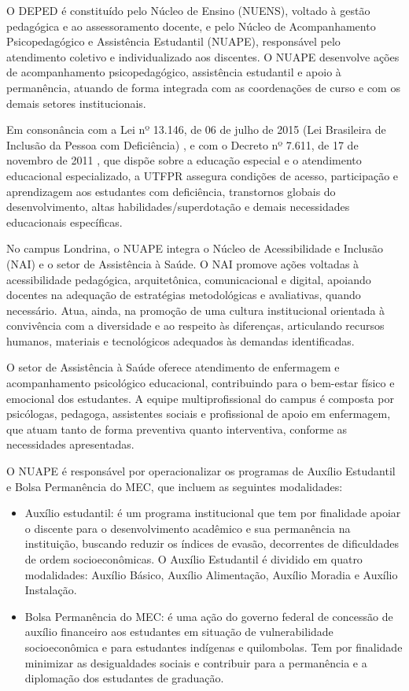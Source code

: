 O DEPED é constituído pelo Núcleo de Ensino (NUENS), voltado à gestão pedagógica e ao assessoramento docente, e pelo Núcleo de Acompanhamento Psicopedagógico e Assistência Estudantil (NUAPE), responsável pelo atendimento coletivo e individualizado aos discentes. O NUAPE desenvolve ações de acompanhamento psicopedagógico, assistência estudantil e apoio à permanência, atuando de forma integrada com as coordenações de curso e com os demais setores institucionais.

Em consonância com a Lei nº 13.146, de 06 de julho de 2015 (Lei Brasileira de Inclusão da Pessoa com Deficiência) \cite{Brasil_2015_Deficiencia}, e com o Decreto nº 7.611, de 17 de novembro de 2011 \cite{Brasil_2011_Deficiencia}, que dispõe sobre a educação especial e o atendimento educacional especializado, a UTFPR assegura condições de acesso, participação e aprendizagem aos estudantes com deficiência, transtornos globais do desenvolvimento, altas habilidades/superdotação e demais necessidades educacionais específicas.

No campus Londrina, o NUAPE integra o Núcleo de Acessibilidade e Inclusão (NAI) e o setor de Assistência à Saúde. O NAI promove ações voltadas à acessibilidade pedagógica, arquitetônica, comunicacional e digital, apoiando docentes na adequação de estratégias metodológicas e avaliativas, quando necessário. Atua, ainda, na promoção de uma cultura institucional orientada à convivência com a diversidade e ao respeito às diferenças, articulando recursos humanos, materiais e tecnológicos adequados às demandas identificadas.

O setor de Assistência à Saúde oferece atendimento de enfermagem e acompanhamento psicológico educacional, contribuindo para o bem-estar físico e emocional dos estudantes. A equipe multiprofissional do campus é composta por psicólogas, pedagoga, assistentes sociais e profissional de apoio em enfermagem, que atuam tanto de forma preventiva quanto interventiva, conforme as necessidades apresentadas.

O NUAPE é responsável por operacionalizar os programas de Auxílio Estudantil e Bolsa Permanência do MEC, que incluem as seguintes modalidades:

\begin{itemize}
    \item Auxílio estudantil: é um programa institucional que tem por finalidade apoiar o discente para o desenvolvimento acadêmico e sua permanência na instituição, buscando reduzir os índices de evasão, decorrentes de dificuldades de ordem socioeconômicas. O Auxílio Estudantil é dividido em quatro modalidades: Auxílio Básico, Auxílio Alimentação, Auxílio Moradia e Auxílio Instalação.
    \item Bolsa Permanência do MEC: é uma ação do governo federal de concessão de auxílio financeiro aos estudantes em situação de vulnerabilidade socioeconômica e para estudantes indígenas e quilombolas. Tem por finalidade minimizar as desigualdades sociais e contribuir para a permanência e a diplomação dos estudantes de graduação.
\end{itemize}

